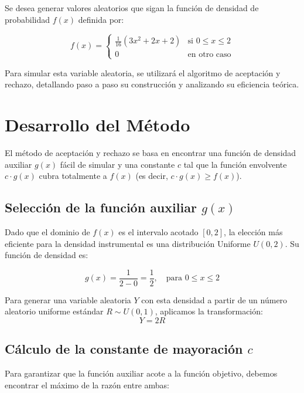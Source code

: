 \documentclass[12pt, a4paper]{article}
\begin{document}
	Se desea generar valores aleatorios que sigan la función de densidad de probabilidad $f(x)$ definida por:
	
	\begin{equation}
		f(x) = 
		\begin{cases} 
			\frac{1}{16} (3x^2 + 2x + 2) & \text{si } 0 \leq x \leq 2 \\
			0 & \text{en otro caso}
		\end{cases}
	\end{equation}
	
	Para simular esta variable aleatoria, se utilizará el algoritmo de aceptación y rechazo, detallando paso a paso su construcción y analizando su eficiencia teórica.
	
	\section{Desarrollo del Método}
	
	El método de aceptación y rechazo se basa en encontrar una función de densidad auxiliar $g(x)$ fácil de simular y una constante $c$ tal que la función envolvente $c \cdot g(x)$ cubra totalmente a $f(x)$ (es decir, $c \cdot g(x) \geq f(x)$).
	
	\subsection{Selección de la función auxiliar $g(x)$}
	
	Dado que el dominio de $f(x)$ es el intervalo acotado $[0, 2]$, la elección más eficiente para la densidad instrumental es una distribución Uniforme $U(0, 2)$. Su función de densidad es:
	
	\begin{equation}
		g(x) = \frac{1}{2-0} = \frac{1}{2}, \quad \text{para } 0 \leq x \leq 2
	\end{equation}
	
	Para generar una variable aleatoria $Y$ con esta densidad a partir de un número aleatorio uniforme estándar $R \sim U(0,1)$, aplicamos la transformación:
	\[ Y = 2R \]
	
	\subsection{Cálculo de la constante de mayoración $c$}
	
	Para garantizar que la función auxiliar acote a la función objetivo, debemos encontrar el máximo de la razón entre ambas:
	
\end{document}
